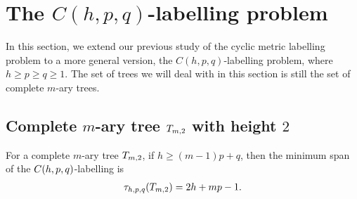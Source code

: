 \section{The $C(h,p, q)$-labelling problem}

In this section, we extend our previous study of the cyclic metric labelling problem to a more general version, the $C(h,p,q)$-labelling problem, where $h \ge p \ge q \ge 1$. The set of trees we will deal with in this section is still the set of complete $m$-ary trees. 




\subsection{Complete $m$-ary tree $\tm2$ with height $2$}
\begin{theorem}
\label{chpq2}
For a complete $m$-ary tree $\tm2$, if $h \ge (m-1)p+q$, then the minimum span of the $C(h,p,q)$-labelling is 
\begin{align*}
\thpq(\tm2)= 2h+mp-1. 
\end{align*}
\end{theorem}

